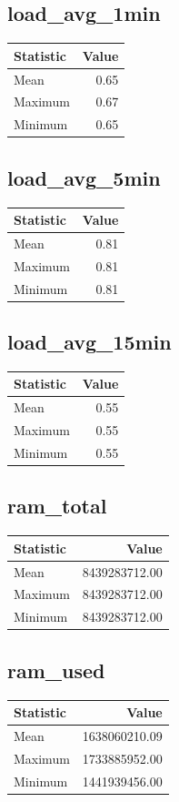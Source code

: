 \documentclass[11pt]{article}
\begin{document}
\subsection{load_avg_1min}
\begin{tabular}{lr}
\toprule
Statistic & Value \\
\midrule
Mean & 0.65 \\
Maximum & 0.67 \\
Minimum & 0.65 \\
\bottomrule
\end{tabular}


\subsection{load_avg_5min}
\begin{tabular}{lr}
\toprule
Statistic & Value \\
\midrule
Mean & 0.81 \\
Maximum & 0.81 \\
Minimum & 0.81 \\
\bottomrule
\end{tabular}


\subsection{load_avg_15min}
\begin{tabular}{lr}
\toprule
Statistic & Value \\
\midrule
Mean & 0.55 \\
Maximum & 0.55 \\
Minimum & 0.55 \\
\bottomrule
\end{tabular}


\subsection{ram_total}
\begin{tabular}{lr}
\toprule
Statistic & Value \\
\midrule
Mean & 8439283712.00 \\
Maximum & 8439283712.00 \\
Minimum & 8439283712.00 \\
\bottomrule
\end{tabular}


\subsection{ram_used}
\begin{tabular}{lr}
\toprule
Statistic & Value \\
\midrule
Mean & 1638060210.09 \\
Maximum & 1733885952.00 \\
Minimum & 1441939456.00 \\
\bottomrule
\end{tabular}
\end{document}
